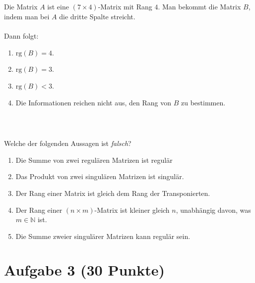 \subsection*{}
Die Matrix $ A $ ist eine $ (7 \times 4) $-Matrix mit Rang $ 4 $.
Man bekommt die Matrix $ B $, indem man bei $ A $ die dritte Spalte streicht.\\
\\
Dann folgt:
\renewcommand{\labelenumi}{(\alph{enumi})}
\begin{enumerate}
	\item 
	$ \mathrm{rg}(B) = 4 $.
	\item
	$ \mathrm{rg}(B) = 3 $.
	
	\item
	$ \mathrm{rg}(B) < 3 $.
	
	\item
	Die Informationen reichen nicht aus, den Rang von $ B $ zu bestimmen.
\end{enumerate}
\ \\
\subsection*{}
Welche der folgenden Aussagen ist \textit{falsch}?
\renewcommand{\labelenumi}{(\alph{enumi})}
\begin{enumerate}
	\item 
	Die Summe von zwei regulären Matrizen ist regulär
	\item
	Das Produkt von zwei singulären Matrizen ist singulär.
	
	\item
	Der Rang einer Matrix ist gleich dem Rang der Transponierten.
	\item
	Der Rang einer $ (n \times m) $-Matrix ist kleiner gleich $ n $, unabhängig davon, was $ m \in \mathbb{N} $ ist.
	\item 
	Die Summe zweier singulärer Matrizen kann regulär sein.
\end{enumerate}

\newpage
\section*{Aufgabe 3 (30 Punkte)}
\vspace{0.4cm}


